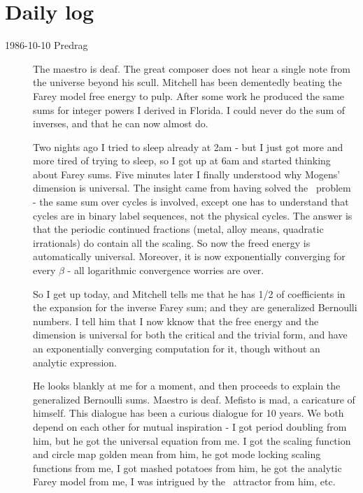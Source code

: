 

\chapter{Daily log}
\label{c-dailyBlog}

\begin{description}

\item[1986-10-10 Predrag]
The maestro is deaf. The great composer does not hear a single note from
the universe beyond his scull. Mitchell has been dementedly beating the
Farey model free energy to pulp. After some work he produced the same
sums for integer powers I derived in Florida. I could never do the sum of
inverses, and that he can now almost do.

Two nights ago I tried to sleep already at 2am - but I just got more and
more tired of trying to sleep, so I got up at 6am and started thinking
about Farey sums. Five minutes later I finally understood why Mogens'
dimension is universal. The insight came from having solved the \Henon\
problem - the same sum over cycles is involved, except one has to
understand that cycles are in binary label sequences, not the physical
cycles. The answer is that the periodic continued fractions (metal, alloy
means, quadratic irrationals) do contain all the scaling. So now the
freed energy is automatically universal. Moreover, it is now
exponentially converging for every $\beta$ - all logarithmic convergence
worries are over.

So I get up today, and Mitchell tells me that he has 1/2 of coefficients
in the expansion for the inverse Farey sum; and they are generalized
Bernoulli numbers. I tell him that I now kknow that the free energy and
the dimension is universal for both the critical and the trivial form,
and have an exponentially converging computation for it, though without
an analytic expression.

He looks blankly at me for a moment, and then proceeds to explain the
generalized Bernoulli sums. Maestro is deaf. Mefisto is mad, a caricature
of himself. This dialogue has been a curious dialogue for 10 years. We
both depend on each other for mutual inspiration - I got period doubling
from him, but he got the universal equation from me. I got the scaling
function and circle map golden mean from him, he got mode locking scaling
functions from me, I got mashed potatoes from him, he got the analytic
Farey model from me, I was intrigued by the \Henon\ attractor from him,
etc.


\end{description}
